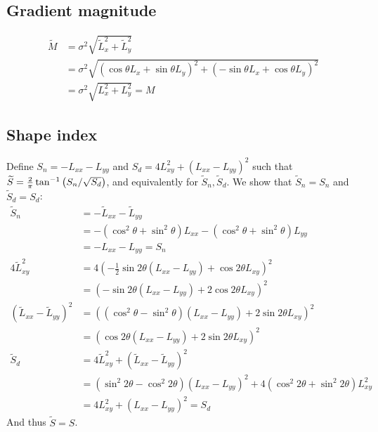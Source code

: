 \documentclass[thesis.tex]{subfiles}
\begin{document}
\subsection{Gradient magnitude} \label{apx:rotation_m}
%
\begin{align*}
\widetilde{M} &= \sigma^2 \sqrt{\widetilde{L}_x^2 + \widetilde{L}_y^2} \\
&= \sigma^2 \sqrt{(\cos \theta L_x + \sin \theta L_y)^2 + (-\sin \theta L_x + \cos \theta L_y)^2} \\
&= \sigma^2 \sqrt{L_x^2 + L_y^2} = M
\end{align*}
%
\subsection{Shape index} \label{apx:rotation_si}
%
Define $S_n = -L_{xx} - L_{yy}$ and $S_d = 4 L_{xy}^2 + (L_{xx} - L_{yy})^2$ such that $\widetilde{S} = \frac{2}{\pi} \tan^{-1} \left( S_n/\sqrt{S_d} \right)$, and equivalently for $\widetilde{S}_n,\widetilde{S}_d$. We show that $\widetilde{S}_n = S_n$ and $\widetilde{S}_d = S_d$:
%
\begin{align*}
\widetilde{S}_n &= - \widetilde{L}_{xx} - \widetilde{L}_{yy} \\
&= -(\cos^2 \theta + \sin^2 \theta)  L_{xx} - (\cos^2 \theta + \sin^2 \theta) L_{yy} \\
&= -L_{xx} - L_{yy} = S_n \\
4\widetilde{L}_{xy}^2 &= 4(-\frac12 \sin 2\theta (L_{xx} - L_{yy}) + \cos 2\theta L_{xy})^2 \\
&= (- \sin 2\theta (L_{xx} - L_{yy}) + 2 \cos 2\theta L_{xy})^2 \\
(\widetilde{L}_{xx} - \widetilde{L}_{yy})^2 &= ((\cos^2 \theta - \sin^2 \theta) (L_{xx} - L_{yy}) + 2 \sin 2\theta L_{xy})^2 \\
&= (\cos 2\theta (L_{xx} - L_{yy}) + 2 \sin 2\theta L_{xy})^2 \\
\widetilde{S}_d &= 4\widetilde{L}_{xy}^2 + (\widetilde{L}_{xx} - \widetilde{L}_{yy})^2 \\
&= (\sin^2 2\theta - \cos^2 2\theta) (L_{xx} - L_{yy})^2 + 4 (\cos^2 2\theta + \sin^2 2\theta) L_{xy}^2 \\
&= 4 L_{xy}^2 + (L_{xx} - L_{yy})^2 = S_d
\end{align*}
%
And thus $\widetilde{S} = S$.
%
\end{document}
